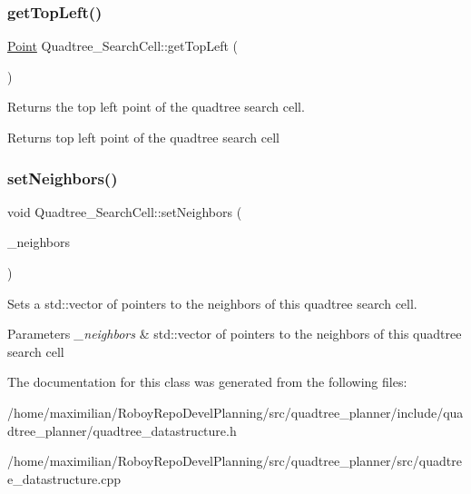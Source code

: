 \subsubsection{\texorpdfstring{get\+Top\+Left()}{getTopLeft()}}
{\footnotesize\ttfamily \hyperlink{structPoint}{Point} Quadtree\+\_\+\+Search\+Cell\+::get\+Top\+Left (\begin{DoxyParamCaption}{ }\end{DoxyParamCaption})}



Returns the top left point of the quadtree search cell. 

\begin{DoxyReturn}{Returns}
top left point of the quadtree search cell 
\end{DoxyReturn}
\mbox{\label{classQuadtree__SearchCell_a36c9e92db030bb40f563d0c3b0453c8b}} 
\subsubsection{\texorpdfstring{set\+Neighbors()}{setNeighbors()}}
{\footnotesize\ttfamily void Quadtree\+\_\+\+Search\+Cell\+::set\+Neighbors (\begin{DoxyParamCaption}\item[{std\+::vector$<$ \hyperlink{classQuadtree__SearchCell}{Quadtree\+\_\+\+Search\+Cell} $\ast$$>$}]{\+\_\+neighbors }\end{DoxyParamCaption})}



Sets a std\+::vector of pointers to the neighbors of this quadtree search cell. 


\begin{DoxyParams}{Parameters}
{\em \+\_\+neighbors} & std\+::vector of pointers to the neighbors of this quadtree search cell \\
\hline
\end{DoxyParams}


The documentation for this class was generated from the following files\+:\begin{DoxyCompactItemize}
\item 
/home/maximilian/\+Roboy\+Repo\+Devel\+Planning/src/quadtree\+\_\+planner/include/quadtree\+\_\+planner/quadtree\+\_\+datastructure.\+h\item 
/home/maximilian/\+Roboy\+Repo\+Devel\+Planning/src/quadtree\+\_\+planner/src/quadtree\+\_\+datastructure.\+cpp\end{DoxyCompactItemize}
